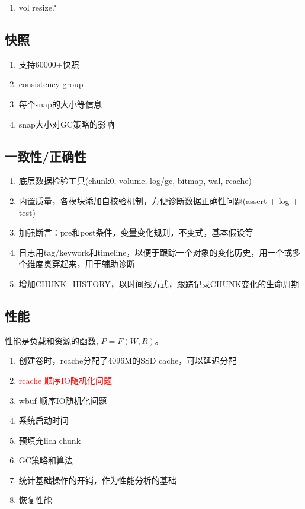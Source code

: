 \documentclass[UTF8]{ctexart}
\begin{document}
\begin{enumerate}
    \item vol resize?
\end{enumerate}

\subsection{快照}

\begin{enumerate}
    \item 支持60000+快照
    \item consistency group
    \item 每个snap的大小等信息
    \item snap大小对GC策略的影响
\end{enumerate}

\subsection{一致性/正确性}

\begin{tcolorbox}
\begin{enumerate}
    \item 底层数据检验工具(chunk0, volume, log/gc, bitmap, wal, rcache)
    \item 内置质量，各模块添加自校验机制，方便诊断数据正确性问题(assert + log + test)
    \item 加强断言：pre和post条件，变量变化规则，不变式，基本假设等
    \item 日志用tag/keywork和timeline，以便于跟踪一个对象的变化历史，用一个或多个维度贯穿起来，用于辅助诊断
    \item 增加CHUNK\_HISTORY，以时间线方式，跟踪记录CHUNK变化的生命周期
\end{enumerate}
\end{tcolorbox}

\subsection{性能}

性能是负载和资源的函数, $P=F(W, R)$。

\begin{tcolorbox}
\begin{enumerate}
    \item 创建卷时，rcache分配了4096M的SSD cache，可以延迟分配
    \item \textcolor{red}{rcache 顺序IO随机化问题}
    \item wbuf 顺序IO随机化问题
    \item 系统启动时间
    \item 预填充lich chunk
    \item GC策略和算法
    \item 统计基础操作的开销，作为性能分析的基础
    \item 恢复性能
\end{enumerate}
\end{tcolorbox}
\end{document}

